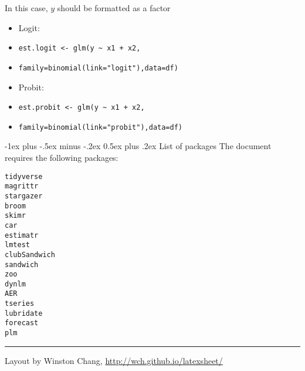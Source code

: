 \documentclass[10pt,landscape]{article}
\makeatletter
\renewcommand{\section}{\@startsection{section}{1}{0mm}%
                                {-1ex plus -.5ex minus -.2ex}%
                                {0.5ex plus .2ex}%
                                {\normalfont\large\bfseries}}
\makeatother
\begin{document}
\begin{multicols}{3}
\smallskip{}

In this case, $y$ should be formatted as a factor

\smallskip{}

\begin{itemize}
    \item Logit:
    \item[] \verb!est.logit <- glm(y ~ x1 + x2,!
    \item[] \verb!family=binomial(link="logit"),data=df)!
    \item Probit:
    \item[] \verb!est.probit <- glm(y ~ x1 + x2,!
    \item[] \verb!family=binomial(link="probit"),data=df)!
\end{itemize}





\section{List of packages}
The document requires the following packages:

\smallskip{}

\begin{multicols}{4}
\verb!tidyverse!  \\
\verb!magrittr!  \\
\verb!stargazer!  \\
\verb!broom!  \\
\verb!skimr! \\
\verb!car!  \\
\verb!estimatr!  \\
\verb!lmtest!  \\
\verb!clubSandwich!  \\
\verb!sandwich!  \\
\verb!zoo!  \\
\verb!dynlm!  \\
\verb!AER!  \\
\verb!tseries!  \\
\verb!lubridate!  \\
\verb!forecast!  \\
\verb!plm!  \\
\end{multicols}

\rule{0.3\linewidth}{0.25pt}
\scriptsize

Layout by Winston Chang, \href{http://wch.github.io/latexsheet/}{http://wch.github.io/latexsheet/}


\end{multicols}
\end{document}
